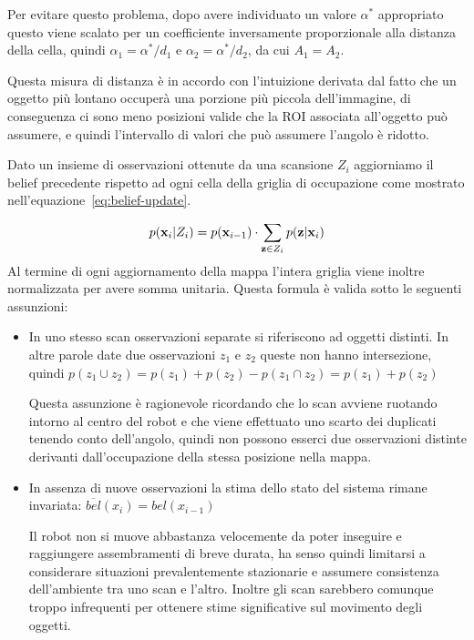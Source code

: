 \documentclass[a4paper]{article}
\begin{document}
		
	Per evitare questo problema, dopo avere
	individuato un valore $ \alpha ^* $ appropriato questo viene scalato per un
	coefficiente inversamente proporzionale alla distanza della cella, quindi $
	\alpha _1 = \alpha ^*/d_1 $ e $ \alpha _2=\alpha ^*/d_2 $, da cui $A_1=A_2$. 
	
	Questa misura di distanza è in accordo con l'intuizione derivata dal fatto
	che un oggetto più lontano occuperà una porzione più piccola dell'immagine,
	di conseguenza ci sono meno posizioni valide che la ROI associata
	all'oggetto può assumere, e quindi l'intervallo di valori che può assumere
	l'angolo è ridotto.

	
	Dato un insieme di osservazioni ottenute da una scansione $ Z_i $ aggiorniamo il belief precedente rispetto ad ogni cella della griglia di occupazione come mostrato nell'equazione~\ref{eq:belief-update}.

	\begin{equation}\label{eq:belief-update}
		p({\bf x}_i | Z_i) = p({\bf x}_{i-1}) \cdot 
		\sum_{{\bf z} \in Z_i} p({\bf z} | {\bf x}_i)
	\end{equation}
	Al termine di ogni aggiornamento della mappa l'intera griglia viene inoltre
	normalizzata per avere somma unitaria.  
	Questa formula è valida sotto le seguenti assunzioni:
	\begin{itemize}
		\item In uno stesso scan osservazioni separate si riferiscono ad
			oggetti distinti. In altre parole date due osservazioni $z_1$ e
			$z_2$ queste non hanno intersezione, quindi $ p(z_1 \cup z_2) =
			p(z_1)+p(z_2)-p( z_1 \cap z_2) = p(z_1)+p(z_2) $ 

			Questa assunzione è ragionevole ricordando che lo scan avviene
			ruotando intorno al centro del robot e che viene effettuato uno
			scarto dei duplicati tenendo conto dell'angolo, quindi non possono
			esserci due osservazioni distinte derivanti dall'occupazione della
			stessa posizione nella mappa.

		\item In assenza di nuove osservazioni la stima dello stato del sistema
			rimane invariata: $ \overline{bel}(x_i) = bel(x_{i-1}) $ 

			Il robot non si muove abbastanza velocemente da poter inseguire e
			raggiungere assembramenti di breve durata, ha senso quindi
			limitarsi a considerare situazioni prevalentemente stazionarie e
			assumere consistenza dell'ambiente tra uno scan e l'altro. Inoltre
			gli scan sarebbero comunque troppo infrequenti per ottenere stime
			significative sul movimento degli oggetti.

	\end{itemize}
\end{document}
